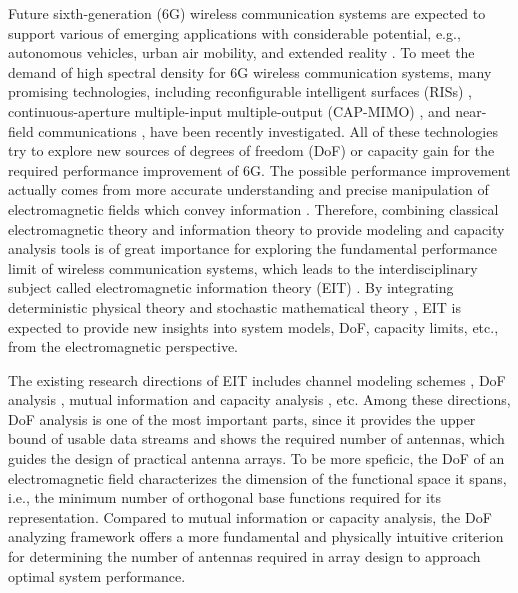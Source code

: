 \documentclass[12pt,draftclsnofoot,journal,onecolumn]{IEEEtran}
\begin{document}
Future sixth-generation (6G) wireless communication systems are expected to support various of emerging applications with considerable potential, e.g., autonomous vehicles, urban air mobility, and extended reality \cite{na2024operator}.
To meet the demand of high spectral density for 6G wireless communication systems, many promising technologies, including reconfigurable intelligent surfaces (RISs) \cite{basar2019wireless,wang2022location}, continuous-aperture multiple-input multiple-output (CAP-MIMO) \cite{huang2020holographic,zhang2023pattern}, and near-field communications \cite{cui2022near,wu2023multiple}, have been recently investigated. All of these technologies try to explore new sources of degrees of freedom (DoF) or capacity gain for the required performance improvement of 6G. The possible performance improvement actually comes from more accurate understanding and precise manipulation of electromagnetic fields which convey information \cite{chafii2023twelve}. Therefore, combining classical electromagnetic theory and information theory to provide modeling and capacity analysis tools is of great importance for exploring the fundamental performance limit of wireless communication systems, which leads to the interdisciplinary subject called electromagnetic information theory (EIT) \cite{migliore2018horse}. By integrating deterministic physical theory and stochastic mathematical theory \cite{zhu2022electromagnetic}, EIT is expected to provide new insights into system models, DoF, capacity limits, etc., from the electromagnetic perspective. 

The existing research directions of EIT includes channel modeling schemes \cite{gong2023holographic,wei2023tri,pizzo2023wide}, DoF analysis \cite{bucci1987spatial, bucci1989degrees,franceschetti2015landau}, mutual information and capacity analysis \cite{jensen2008capacity,jeon2017capacity,wan2022mutual}, etc.
Among these directions, DoF analysis is one of the most important parts, since it provides the upper bound of usable data streams and shows the required number of antennas, which guides the design of practical antenna arrays. {\color{red}To be more speficic, the DoF of an electromagnetic field characterizes the dimension of the functional space it spans, i.e., the minimum number of orthogonal base functions required for its representation. Compared to mutual information or capacity analysis, the DoF analyzing framework offers a more fundamental and physically intuitive criterion for determining the number of antennas required in array design to approach optimal system performance. }
\end{document}
